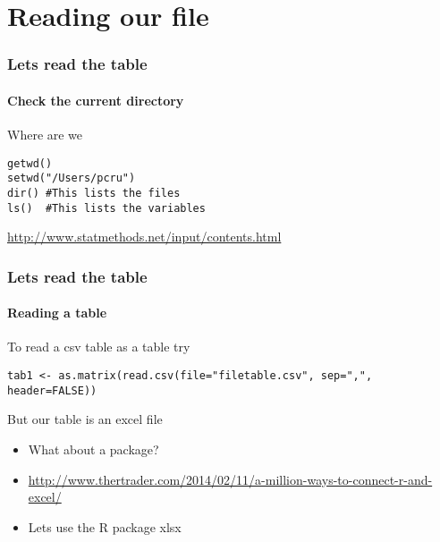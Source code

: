 \documentclass[12pt]{beamer}\usepackage[]{graphicx}\usepackage[]{color}
\begin{document}
\section*{Reading our file}
\begin{frame}[fragile]
  \frametitle{Lets read the table}
  \framesubtitle{Check the current directory}
\begin{block}{Where are we}
\begin{lstlisting} 
getwd()
setwd("/Users/pcru")
dir() #This lists the files
ls()  #This lists the variables
\end{lstlisting}
\url{http://www.statmethods.net/input/contents.html}
\end{block}
\end{frame}

\begin{frame}[fragile]
  \frametitle{Lets read the table}
  \framesubtitle{Reading a table}
\begin{block}{To read a csv table as a table try}
\begin{lstlisting} 
tab1 <- as.matrix(read.csv(file="filetable.csv", sep=",", header=FALSE))
\end{lstlisting}
\end{block}
\begin{block}{But our table is an excel file}
\begin{itemize}
\item What about a package?
\item \url{http://www.thertrader.com/2014/02/11/a-million-ways-to-connect-r-and-excel/}
\item Lets use the R package xlsx
\end{itemize}
\end{block}
\end{frame}
\end{document}
